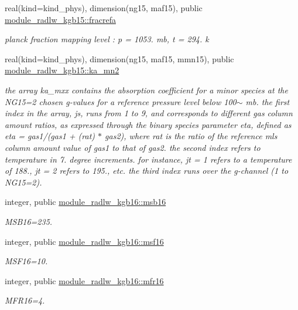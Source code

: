 \begin{Indent}
\begin{DoxyCompactItemize}
real(kind=kind\+\_\+phys), dimension(ng15, maf15), public \hyperlink{group__module__radlw__kgbnn_ga4b5c5f6fd9ea806843adf78ec1b43cd2}{module\+\_\+radlw\+\_\+kgb15\+::fracrefa}
\begin{DoxyCompactList}\small\item\em planck fraction mapping level \+: p = 1053. mb, t = 294. k \end{DoxyCompactList}\item 
real(kind=kind\+\_\+phys), dimension(ng15, maf15, mmn15), public \hyperlink{group__module__radlw__kgbnn_gaff32d89fe8fef50ff79136cc7aa50526}{module\+\_\+radlw\+\_\+kgb15\+::ka\+\_\+mn2}
\begin{DoxyCompactList}\small\item\em the array ka\+\_\+mxx contains the absorption coefficient for a minor species at the N\+G15=2 chosen g-\/values for a reference pressure level below 100$\sim$ mb. the first index in the array, js, runs from 1 to 9, and corresponds to different gas column amount ratios, as expressed through the binary species parameter eta, defined as eta = gas1/(gas1 + (rat) $\ast$ gas2), where rat is the ratio of the reference mls column amount value of gas1 to that of gas2. the second index refers to temperature in 7. degree increments. for instance, jt = 1 refers to a temperature of 188., jt = 2 refers to 195., etc. the third index runs over the g-\/channel (1 to N\+G15=2). \end{DoxyCompactList}\item 
integer, public \hyperlink{group__module__radlw__kgbnn_ga18ad5b461d6c71b1aa2d82d5694beb03}{module\+\_\+radlw\+\_\+kgb16\+::msb16}
\begin{DoxyCompactList}\small\item\em M\+S\+B16=235. \end{DoxyCompactList}\item 
integer, public \hyperlink{group__module__radlw__kgbnn_ga8601911604c1d6a1b32e434159ae95d2}{module\+\_\+radlw\+\_\+kgb16\+::msf16}
\begin{DoxyCompactList}\small\item\em M\+S\+F16=10. \end{DoxyCompactList}\item 
integer, public \hyperlink{group__module__radlw__kgbnn_ga82777667b951207c62955e3e1492d79d}{module\+\_\+radlw\+\_\+kgb16\+::mfr16}
\begin{DoxyCompactList}\small\item\em M\+F\+R16=4. \end{DoxyCompactList}\item 

\end{DoxyCompactItemize}
\end{Indent}
